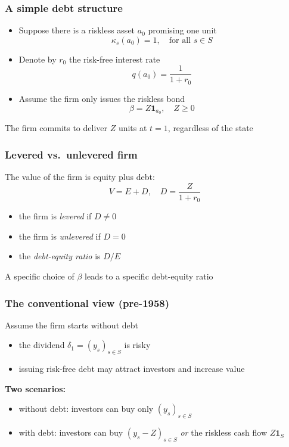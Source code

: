 \documentclass[blue]{beamer}
\def\1{\mathbf{1}}
\def\geq{\geqslant}
\theoremstyle{definition}
\theoremstyle{example}
\begin{document}
\begin{frame}\frametitle{A simple debt structure}
\begin{itemize}
\item Suppose there is a riskless asset $a_0$ promising one unit
\begin{equation*}
\kappa_s(a_0) = 1, \quad \text{for all $s \in S$}
\end{equation*}
\item Denote by $r_0$ the risk-free interest rate
\begin{equation*}
q(a_0) = \frac{1}{1+r_0}
\end{equation*}
\item Assume the firm only issues the riskless bond
\begin{equation*}
\beta = Z \1_{a_0}, \quad Z \geq 0
\end{equation*}
\end{itemize}
\bigskip

The firm commits to deliver $Z$ units at $t=1$, regardless of the state
\end{frame}

\begin{frame}\frametitle{Levered vs.\ unlevered firm}
The value of the firm is equity plus debt:
\begin{equation*}
V = E + D, \quad D = \frac{Z}{1+r_0}
\end{equation*}
\bigskip

\begin{itemize}
\item the firm is \emph{levered} if $D \neq 0$
\item the firm is \emph{unlevered} if $D = 0$
\item the \emph{debt-equity ratio} is $D/E$
\end{itemize}
\bigskip

A specific choice of $\beta$ leads to a specific debt-equity ratio
\end{frame}

\begin{frame}\frametitle{The conventional view (pre-1958)}
Assume the firm starts without debt
\begin{itemize}
\item the dividend $\delta_1 = (y_s)_{s \in S}$ is risky
\item issuing risk-free debt may attract investors and increase value
\end{itemize}
\bigskip

\textbf{Two scenarios:}
\begin{itemize}
\item without debt: investors can buy only $(y_s)_{s \in S}$
\item with debt: investors can buy $(y_s - Z)_{s \in S}$ \emph{or} the riskless cash flow $Z \1_S$
\end{itemize}
\end{frame}
\end{document}
